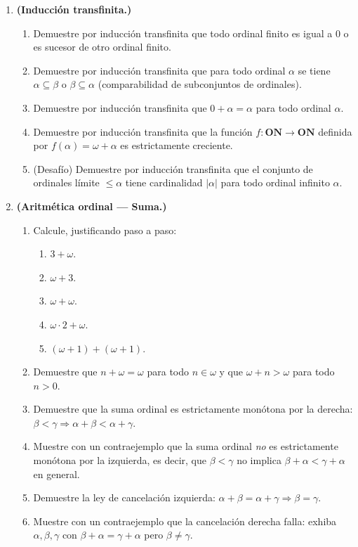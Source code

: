 \begin{enumerate}[leftmargin=2.5em, label=\textbf{\arabic*.}]
  \item \textbf{(Inducción transfinita.)}
  \begin{enumerate}[label=(\alph*)]
    \item Demuestre por inducción transfinita que todo ordinal finito es igual a $0$ o es sucesor de otro ordinal finito.
    \item Demuestre por inducción transfinita que para todo ordinal $\alpha$ se tiene $\alpha \subseteq \beta$ o $\beta \subseteq \alpha$ (comparabilidad de subconjuntos de ordinales).
    \item Demuestre por inducción transfinita que $0 + \alpha = \alpha$ para todo ordinal $\alpha$.
    \item Demuestre por inducción transfinita que la función $f: \mathbf{ON} \to \mathbf{ON}$ definida por $f(\alpha) = \omega + \alpha$ es estrictamente creciente.
    \item (Desafío) Demuestre por inducción transfinita que el conjunto de ordinales límite $\leq \alpha$ tiene cardinalidad $|\alpha|$ para todo ordinal infinito $\alpha$.
  \end{enumerate}

  \item \textbf{(Aritmética ordinal — Suma.)}
  \begin{enumerate}[label=(\alph*)]
    \item Calcule, justificando paso a paso:
    \begin{enumerate}[label=(\roman*)]
      \item $3 + \omega$.
      \item $\omega + 3$.
      \item $\omega + \omega$.
      \item $\omega \cdot 2 + \omega$.
      \item $(\omega + 1) + (\omega + 1)$.
    \end{enumerate}
    \item Demuestre que $n + \omega = \omega$ para todo $n \in \omega$ y que $\omega + n > \omega$ para todo $n > 0$.
    \item Demuestre que la suma ordinal es estrictamente monótona por la derecha: $\beta < \gamma \Rightarrow \alpha + \beta < \alpha + \gamma$.
    \item Muestre con un contraejemplo que la suma ordinal \emph{no} es estrictamente monótona por la izquierda, es decir, que $\beta < \gamma$ no implica $\beta + \alpha < \gamma + \alpha$ en general.
    \item Demuestre la ley de cancelación izquierda: $\alpha + \beta = \alpha + \gamma \Rightarrow \beta = \gamma$.
    \item Muestre con un contraejemplo que la cancelación derecha falla: exhiba $\alpha, \beta, \gamma$ con $\beta + \alpha = \gamma + \alpha$ pero $\beta \neq \gamma$.
  \end{enumerate}


\end{enumerate}
